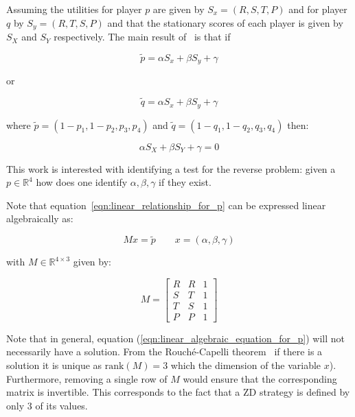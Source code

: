 \documentclass[a4paper]{article}
\begin{document}
Assuming the utilities for player \(p\) are given by \(S_x=(R, S, T, P)\) and
for player \(q\) by \(S_y=(R, T, S, P)\) and that the stationary scores of each
player is given by \(S_X\) and \(S_Y\) respectively. The main result
of~\cite{Press2012} is that if

\begin{equation}\label{eqn:linear_relationship_for_p}
    \tilde p=\alpha S_x + \beta S_y + \gamma
\end{equation}

or

\begin{equation}\label{eqn:linear_relationship_for_q}
    \tilde q=\alpha S_x + \beta S_y + \gamma
\end{equation}

where \(\tilde p = (1 - p_1, 1 - p_2, p_3, p_4)\) and
\(\tilde q = (1 - q_1, 1 - q_2, q_3, q_4)\) then:

\begin{equation}
    \alpha S_X + \beta S_Y + \gamma = 0
\end{equation}

This work is interested with identifying a test for the reverse problem: given a
\(p\in\mathbb{R}^4\) how does one identify \(\alpha, \beta, \gamma\) if they
exist.

Note that equation~\ref{eqn:linear_relationship_for_p} can be expressed linear
algebraically as:

\begin{equation}\label{eqn:linear_algebraic_equation_for_p}
    Mx=\tilde p  \qquad x=(\alpha, \beta, \gamma)
\end{equation}

with \(M\in\mathbb{R}^{4\times 3}\) given by:

\begin{equation}\label{eqn:definition_of_M}
    M =
    \begin{bmatrix}
        R & R & 1\\
        S & T & 1\\
        T & S & 1\\
        P & P & 1
    \end{bmatrix}
\end{equation}


Note that in general, equation (\ref{eqn:linear_algebraic_equation_for_p}) will
not necessarily have a solution. From the Rouché-Capelli theorem~\cite{}%
if there is a solution it is unique as \(\text{rank}(M)=3\) which the dimension of
the variable \(x\)). Furthermore, removing a single row of \(M\) would
ensure that the corresponding matrix is invertible. This corresponds to the fact
that a ZD strategy is defined by only 3 of its values.
\end{document}
